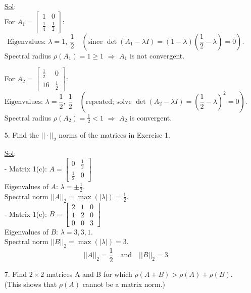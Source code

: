 \begin{enumerate}
    \underline{Sol}:\\
    For \(A_1 =
      \begin{bmatrix} 1 & 0 \\ \frac{1}{4} & \frac{1}{2}
    \end{bmatrix}\):
    \[
      \text{Eigenvalues: } \lambda = 1,\ \frac{1}{2} \quad
      (\text{since } \det(A_1 - \lambda I) = (1 -
      \lambda)\left(\frac{1}{2} - \lambda\right) = 0).
    \]
    Spectral radius \(\rho(A_1) = 1 \geq 1\) \(\Rightarrow\) \(A_1\)
    is not convergent.

    For \(A_2 =
      \begin{bmatrix} \frac{1}{2} & 0 \\ 16 & \frac{1}{2}
    \end{bmatrix}\):
    \[
      \text{Eigenvalues: } \lambda = \frac{1}{2},\ \frac{1}{2} \quad
      (\text{repeated; solve } \det(A_2 - \lambda I) =
      \left(\frac{1}{2} - \lambda\right)^2 = 0).
    \]
    Spectral radius \(\rho(A_2) = \frac{1}{2} < 1\) \(\Rightarrow\)
    \(A_2\) is convergent.

  \item[5.] Find the \(|| \cdot ||_2\) norms of the matrices in Exercise 1.
  
  \underline{Sol}:\\
  - Matrix 1(c): \(A = \begin{bmatrix} 0 & \frac{1}{2} \\ \frac{1}{2} & 0 \end{bmatrix}\) \\
    Eigenvalues of \(A\): \(\lambda = \pm \frac{1}{2}\). \\
    Spectral norm \(||A||_2 = \max(|\lambda|) = \frac{1}{2}\). \\

  - Matrix 1(e): \(B = \begin{bmatrix} 2 & 1 & 0 \\ 1 & 2 & 0 \\ 0 & 0 & 3 \end{bmatrix}\) \\
    Eigenvalues of \(B\): \(\lambda = 3, 3, 1\). \\
    Spectral norm \(||B||_2 = \max(|\lambda|) = 3\). \\

  \[
  \boxed{||A||_2 = \dfrac{1}{2} \quad \text{and} \quad ||B||_2 = 3}
  \]

  \item[7.] Find \(2 \times 2\) matrices A and B for which \(\rho (A
    + B) > \rho (A) + \rho (B)\). (This shows that \(\rho (A)\)
    cannot be a matrix norm.)


\end{enumerate}
